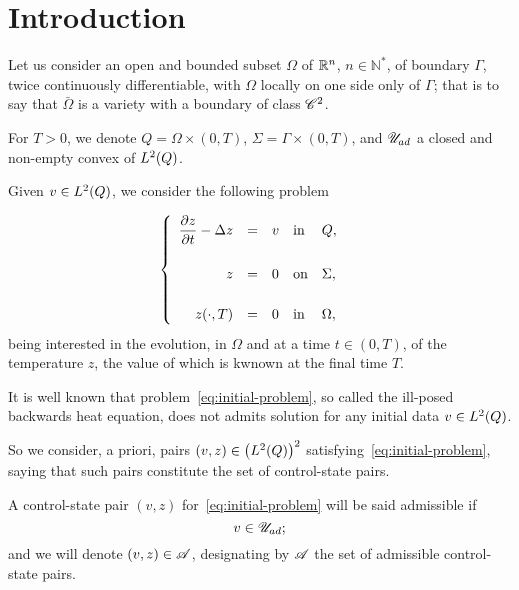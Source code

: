 \section{Introduction}

Let us consider an open and bounded subset $\Omega$ of ${\mathbb{R}}^{n}$, $n\in
{\mathbb{N}}^{*}$, of boundary ${\Gamma}$, twice continuously
differentiable, with $\Omega$ locally on one side only of $\Gamma$; that is
to say that $\bar{\Omega}$ is a variety with a boundary of class
${\mathscr{C}}^{2}$.

For $T > 0$, we denote $\displaystyle Q = \Omega\times(0,T)$, $\displaystyle
\Sigma = \Gamma\times (0,T)$, and $\displaystyle {\mathscr{U}}_{ad}$ a closed and
non-empty convex of $L^{2}\!\left({Q}\right)$.

Given $v\in L^{2}\!\left({Q}\right)$, we consider the following problem

\begin{equation}\label{eq:initial-problem}
    \begin{cases}\displaystyle
        \begin{array}{rclll}
            \dfrac{\partial{}z}{\partial{}t} - \Delta z & = & v & \text{in} & Q,\\
            \\
            z & = & 0 & \text{on} & \Sigma,\\
            \\
            {z}\!\left({\cdot,T}\right) & = & 0 & \text{in} & \Omega,
        \end{array}
    \end{cases}
\end{equation}
being interested in the evolution, in $\Omega$ and at a time $t\in (0,T)$,
of the temperature $z$, the value of which is kwnown at the final time $T$.

It is well known that problem~\eqref{eq:initial-problem}, so called the
ill-posed backwards heat equation, does not admits solution for any initial
data $v\in L^{2}\!\left({Q}\right)$.

So we consider, a priori, pairs $(v,z)\in {\left({L^{2}\!\left({Q}\right)}\right)}^{2}$
satisfying~\eqref{eq:initial-problem}, saying that such pairs constitute
the set of control-state pairs.

A control-state pair $(v,z)$ for~\eqref{eq:initial-problem} will be said
admissible if
\begin{equation*}\label{eq:admissible-control-state-pair}
    v\in {\mathscr{U}}_{ad};
\end{equation*}
and we will denote $(v,z)\in \mathscr{A}$, designating by $\mathscr{A}$ the set of
admissible control-state pairs.


